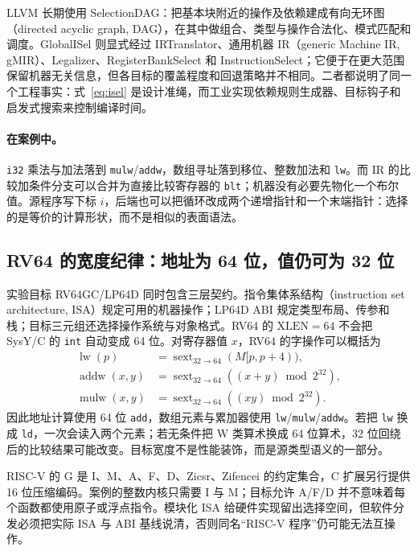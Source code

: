 LLVM 长期使用 SelectionDAG：把基本块附近的操作及依赖建成有向无环图（directed acyclic graph, DAG），在其中做组合、类型与操作合法化、模式匹配和调度。GlobalISel 则显式经过 IRTranslator、通用机器 IR（generic Machine IR, gMIR）、Legalizer、RegisterBankSelect 和 InstructionSelect；它便于在更大范围保留机器无关信息，但各目标的覆盖程度和回退策略并不相同\cite{llvm-globalisel,llvm-globalisel-pipeline}。二者都说明了同一个工程事实：式~\ref{eq:isel} 是设计准绳，而工业实现依赖规则生成器、目标钩子和启发式搜索来控制编译时间。

\paragraph{在案例中。}
\texttt{i32} 乘法与加法落到 \texttt{mulw}/\texttt{addw}，数组寻址落到移位、整数加法和 \texttt{lw}。而 IR 的比较加条件分支可以合并为直接比较寄存器的 \texttt{blt}；机器没有必要先物化一个布尔值。源程序写下标 $i$，后端也可以把循环改成两个递增指针和一个末端指针：选择的是等价的计算形状，而不是相似的表面语法。

\subsection{RV64 的宽度纪律：地址为 64 位，值仍可为 32 位}

实验目标 RV64GC/LP64D 同时包含三层契约。指令集体系结构（instruction set architecture, ISA）规定可用的机器操作；LP64D ABI 规定类型布局、传参和栈；目标三元组还选择操作系统与对象格式。RV64 的 $\mathrm{XLEN}=64$ 不会把 SysY/C 的 \texttt{int} 自动变成 64 位。对寄存器值 $x$，RV64 的字操作可以概括为
\begin{align}
  \operatorname{lw}(p) &= \operatorname{sext}_{32\to64}(M[p,p+4)),\\
  \operatorname{addw}(x,y) &= \operatorname{sext}_{32\to64}((x+y)\bmod 2^{32}),\\
  \operatorname{mulw}(x,y) &= \operatorname{sext}_{32\to64}((xy)\bmod 2^{32}).
\end{align}
因此地址计算使用 64 位 \texttt{add}，数组元素与累加器使用 \texttt{lw}/\texttt{mulw}/\texttt{addw}\cite{bin-riscv-unpriv}。若把 \texttt{lw} 换成 \texttt{ld}，一次会读入两个元素；若无条件把 W 类算术换成 64 位算术，32 位回绕后的比较结果可能改变。目标宽度不是性能装饰，而是源类型语义的一部分。

RISC-V 的 G 是 I、M、A、F、D、Zicsr、Zifencei 的约定集合，C 扩展另行提供 16 位压缩编码\cite{bin-riscv-naming}。案例的整数内核只需要 I 与 M；目标允许 A/F/D 并不意味着每个函数都使用原子或浮点指令。模块化 ISA 给硬件实现留出选择空间，但软件分发必须把实际 ISA 与 ABI 基线说清，否则同名“RISC-V 程序”仍可能无法互操作。

